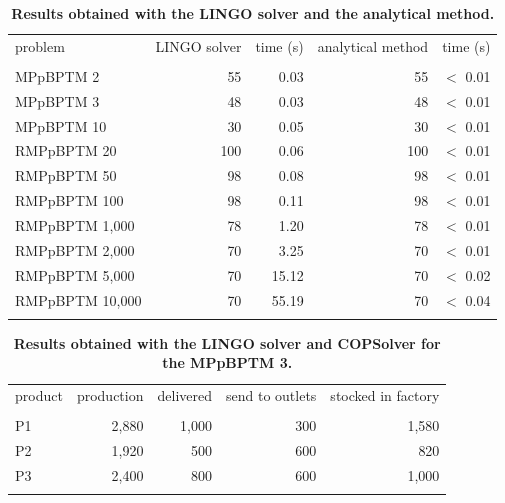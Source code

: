 \documentclass[10pt,fleqn,a4paper,twoside]{article}
\begin{document}
\begin{table}[h!]
\begin{center}
\caption{\textbf{Results obtained with the LINGO solver and the analytical method.}}
\begin{footnotesize}
\begin{tabular}[c]{l r r r r}
\\
problem & LINGO solver & time (s) & analytical method & time (s) \\
\cline {1-5} \\
MPpBPTM 2 & 55 & 0.03 & 55 & $<$ 0.01 \\
MPpBPTM 3 & 48 & 0.03 & 48 & $<$ 0.01 \\
MPpBPTM 10 & 30 & 0.05 & 30 & $<$ 0.01 \\
RMPpBPTM 20 & 100 & 0.06 & 100 & $<$ 0.01 \\
RMPpBPTM 50 & 98 & 0.08 & 98 & $<$ 0.01 \\
RMPpBPTM 100 & 98 & 0.11 & 98 & $<$ 0.01 \\
RMPpBPTM 1,000 & 78 & 1.20 & 78 & $<$ 0.01 \\
RMPpBPTM 2,000 & 70 & 3.25 & 70 & $<$ 0.01 \\
RMPpBPTM 5,000 & 70 & 15.12 & 70 & $<$ 0.02 \\
RMPpBPTM 10,000 & 70 & 55.19 & 70 & $<$ 0.04 \\
\cline {1-5} \\
\end{tabular}
\label{tab:results}
\end{footnotesize}
\end{center}
\end{table}

\begin{table}[h!]
\begin{center}
\caption{\textbf{Results obtained with the LINGO solver and COPSolver for the MPpBPTM 3.}}
\begin{footnotesize}
\begin{tabular}[c]{l r r r r}
\\
product & production & delivered & send to outlets & stocked in factory \\
\cline {1-5} \\
P1 & 2,880 & 1,000 & 300 & 1,580 \\
P2 & 1,920 & 500 & 600 & 820 \\
P3 & 2,400 & 800 & 600 & 1,000 \\
\cline {1-5} \\
\end{tabular}
\label{tab:compResultsMBPTMP2}
\end{footnotesize}
\end{center}
\end{table}
\end{document}
